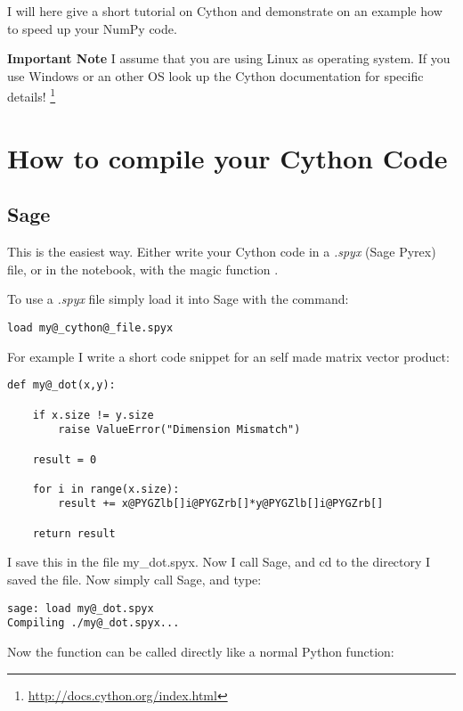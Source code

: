 \documentclass[letterpaper,10pt,english]{manual}
\begin{document}
I will here give a short tutorial on Cython and demonstrate on an
example how to speed up your NumPy code.

\textbf{Important Note} I assume that you are using Linux as operating
system. If you use Windows or an other OS look up the Cython
documentation for specific details! \footnote{
\href{http://docs.cython.org/index.html}{http://docs.cython.org/index.html}
}


\section{How to compile your Cython Code}


\subsection{Sage}

This is the easiest way. Either write your Cython
code in a \emph{.spyx} (Sage Pyrex) file, or in the notebook, with the
magic function .

To use a \emph{.spyx} file simply load it into Sage with the 
command:

\begin{Verbatim}[commandchars=@\[\]]
load my@_cython@_file.spyx
\end{Verbatim}

For example I write a short code snippet for an self made
matrix vector product:

\begin{Verbatim}[commandchars=@\[\]]
def my@_dot(x,y):

    if x.size != y.size
        raise ValueError("Dimension Mismatch")

    result = 0

    for i in range(x.size):
        result += x@PYGZlb[]i@PYGZrb[]*y@PYGZlb[]i@PYGZrb[]

    return result
\end{Verbatim}

I save this in the file my\_dot.spyx. Now I call Sage, and cd to the
directory I saved the file. Now simply call Sage, and type:

\begin{Verbatim}[commandchars=@\[\]]
sage: load my@_dot.spyx
Compiling ./my@_dot.spyx...
\end{Verbatim}

Now the function can be called directly like a normal Python
function:
\end{document}
